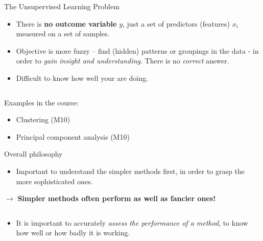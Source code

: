 \documentclass[ignorenonframetext,]{beamer}
\providecommand{\tightlist}{%
  \setlength{\itemsep}{0pt}\setlength{\parskip}{0pt}}
\begin{document}
\begin{frame}{The Unsupervised Learning Problem}
\protect\hypertarget{the-unsupervised-learning-problem}{}

\begin{itemize}
\item
  There is \textbf{no outcome variable} \(y\), just a set of predictors
  (features) \(x_i\) measured on a set of samples.
\item
  Objective is more fuzzy -- find (hidden) patterns or groupings in the
  data - in order to \emph{gain insight and understanding}. There is no
  \emph{correct} answer.
\item
  Difficult to know how well your are doing.
\end{itemize}

\(~\)

Examples in the course:

\begin{itemize}
\tightlist
\item
  Clustering (M10)
\item
  Principal component analysis (M10)
\end{itemize}

\end{frame}

\begin{frame}{Overall philosophy}
\protect\hypertarget{overall-philosophy}{}

\begin{itemize}
\tightlist
\item
  Important to understand the simpler methods first, in order to grasp
  the more sophisticated ones.
\end{itemize}

\(\rightarrow\) \textbf{Simpler methods often perform as well as fancier
ones!}

\(~\)

\begin{itemize}
\tightlist
\item
  It is important to accurately \emph{assess the performance of a
  method}, to know how well or how badly it is working.
\end{itemize}

\end{frame}
\end{document}
